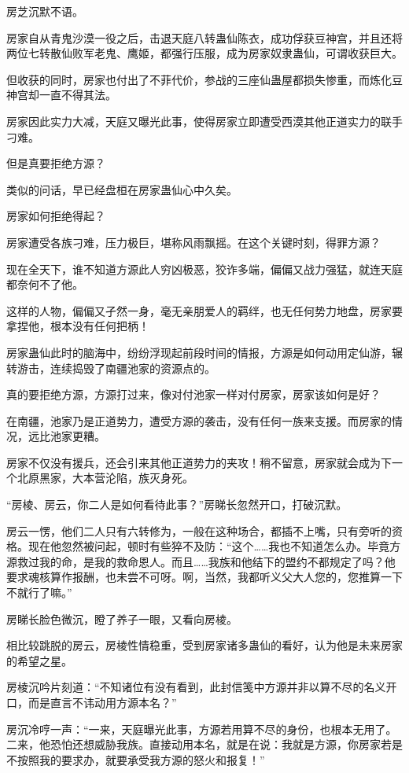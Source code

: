 \begin{this_body}
房芝沉默不语。

房家自从青鬼沙漠一役之后，击退天庭八转蛊仙陈衣，成功俘获豆神宫，并且还将两位七转散仙败军老鬼、鹰姬，都强行压服，成为房家奴隶蛊仙，可谓收获巨大。

但收获的同时，房家也付出了不菲代价，参战的三座仙蛊屋都损失惨重，而炼化豆神宫却一直不得其法。

房家因此实力大减，天庭又曝光此事，使得房家立即遭受西漠其他正道实力的联手刁难。

但是真要拒绝方源？

类似的问话，早已经盘桓在房家蛊仙心中久矣。

房家如何拒绝得起？

房家遭受各族刁难，压力极巨，堪称风雨飘摇。在这个关键时刻，得罪方源？

现在全天下，谁不知道方源此人穷凶极恶，狡诈多端，偏偏又战力强猛，就连天庭都奈何不了他。

这样的人物，偏偏又孑然一身，毫无亲朋爱人的羁绊，也无任何势力地盘，房家要拿捏他，根本没有任何把柄！

房家蛊仙此时的脑海中，纷纷浮现起前段时间的情报，方源是如何动用定仙游，辗转游击，连续捣毁了南疆池家的资源点的。

真的要拒绝方源，方源打过来，像对付池家一样对付房家，房家该如何是好？

在南疆，池家乃是正道势力，遭受方源的袭击，没有任何一族来支援。而房家的情况，远比池家更糟。

房家不仅没有援兵，还会引来其他正道势力的夹攻！稍不留意，房家就会成为下一个北原黑家，大本营沦陷，族灭身死。

“房棱、房云，你二人是如何看待此事？”房睇长忽然开口，打破沉默。

房云一愣，他们二人只有六转修为，一般在这种场合，都插不上嘴，只有旁听的资格。现在他忽然被问起，顿时有些猝不及防：“这个……我也不知道怎么办。毕竟方源救过我的命，是我的救命恩人。而且……我族和他结下的盟约不都规定了吗？他要求魂核算作报酬，也未尝不可呀。啊，当然，我都听义父大人您的，您推算一下不就行了嘛。”

房睇长脸色微沉，瞪了养子一眼，又看向房棱。

相比较跳脱的房云，房棱性情稳重，受到房家诸多蛊仙的看好，认为他是未来房家的希望之星。

房棱沉吟片刻道：“不知诸位有没有看到，此封信笺中方源并非以算不尽的名义开口，而是直言不讳动用方源本名？”

房沉冷哼一声：“一来，天庭曝光此事，方源若用算不尽的身份，也根本无用了。二来，他恐怕还想威胁我族。直接动用本名，就是在说：我就是方源，你房家若是不按照我的要求办，就要承受我方源的怒火和报复！”


\end{this_body}
